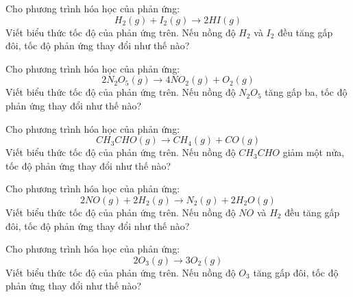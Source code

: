 \documentclass[Main.tex]{subfiles}
\begin{document}
\begin{bt}
	Cho phương trình hóa học của phản ứng:
	\[H_2(g) + I_2(g) \rightarrow 2HI(g)\]
	Viết biểu thức tốc độ của phản ứng trên. Nếu nồng độ $H_2$ và $I_2$ đều tăng gấp đôi, tốc độ phản ứng thay đổi như thế nào?
\end{bt}

\begin{bt}
	Cho phương trình hóa học của phản ứng:
	\[2N_2O_5(g) \rightarrow 4NO_2(g) + O_2(g)\]
	Viết biểu thức tốc độ của phản ứng trên. Nếu nồng độ $N_2O_5$ tăng gấp ba, tốc độ phản ứng thay đổi như thế nào?
\end{bt}

\begin{bt}
	Cho phương trình hóa học của phản ứng:
	\[CH_3CHO(g) \rightarrow CH_4(g) + CO(g)\]
	Viết biểu thức tốc độ của phản ứng trên. Nếu nồng độ $CH_3CHO$ giảm một nửa, tốc độ phản ứng thay đổi như thế nào?
\end{bt}

\begin{bt}
	Cho phương trình hóa học của phản ứng:
	\[2NO(g) + 2H_2(g) \rightarrow N_2(g) + 2H_2O(g)\]
	Viết biểu thức tốc độ của phản ứng trên. Nếu nồng độ $NO$ và $H_2$ đều tăng gấp đôi, tốc độ phản ứng thay đổi như thế nào?
\end{bt}

\begin{bt}
	Cho phương trình hóa học của phản ứng:
	\[2O_3(g) \rightarrow 3O_2(g)\]
	Viết biểu thức tốc độ của phản ứng trên. Nếu nồng độ $O_3$ tăng gấp đôi, tốc độ phản ứng thay đổi như thế nào?
\end{bt}
\end{document}
